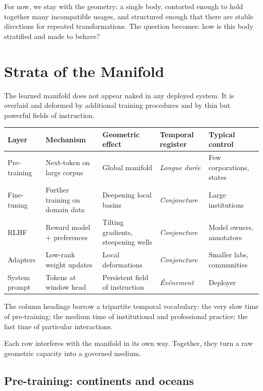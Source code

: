 For now, we stay with the geometry: a single body, contorted enough to hold together many incompatible usages, and structured enough that there are stable directions for repeated transformations. The question becomes: how is this body stratified and made to behave?

\section{Strata of the Manifold}

The learned manifold does not appear naked in any deployed system. It is overlaid and deformed by additional training procedures and by thin but powerful fields of instruction.

\begin{formalbox}[title={Strata of the manifold}]
\begin{tabular}{@{}lllll@{}}
\toprule
\textbf{Layer} & \textbf{Mechanism} & \textbf{Geometric effect} & \textbf{Temporal register} & \textbf{Typical control} \\
\midrule
Pre-training   & Next-token on large corpus & Global manifold                & \emph{Longue dur\'{e}e} & Few corporations, states \\
Fine-tuning    & Further training on domain data& Deepening local basins     & \emph{Conjoncture}      & Large institutions        \\
RLHF           & Reward model + preferences & Tilting gradients, steepening wells & \emph{Conjoncture} & Model owners, annotators  \\
Adapters       & Low-rank weight updates    & Local deformations             & \emph{Conjoncture}      & Smaller labs, communities \\
System prompt  & Tokens at window head      & Persistent field of instruction& \emph{\'{E}v\'{e}nement} & Deployer                  \\
\bottomrule
\end{tabular}
\end{formalbox}

The column headings borrow a tripartite temporal vocabulary: the very slow time of pre-training; the medium time of institutional and professional practice; the fast time of particular interactions.

Each row interferes with the manifold in its own way. Together, they turn a raw geometric capacity into a governed medium.

\subsection*{Pre-training: continents and oceans}

